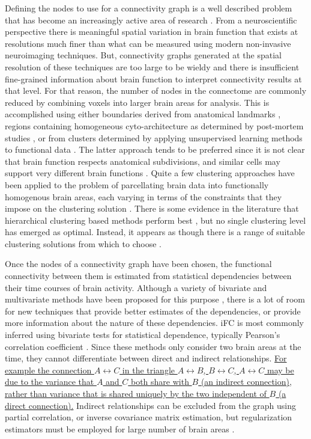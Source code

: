 \documentclass{bmcart}
\newcommand{\ADDED}[1]{\textcolor{markercolor}{\uline{#1}}}
\begin{document}
Defining the nodes to use for a connectivity graph is a well described problem that has become an increasingly active area of research \cite{Thirion2014}. From a neuroscientific perspective there is meaningful spatial variation in brain function that exists at resolutions much finer than what can be measured using modern non-invasive neuroimaging techniques. But, connectivity graphs generated at the spatial resolution of these techniques are too large to be wieldy and there is insufficient fine-grained information about brain function to interpret connectivity results at that level. For that reason, the number of nodes in the connectome are commonly reduced by combining voxels into larger brain areas for analysis. This is accomplished using either boundaries derived from anatomical landmarks \cite{Desikan2006,AAL2002}, regions containing homogeneous cyto-architecture as determined by post-mortem studies \cite{Eickhoff2008}, or from clusters determined by applying unsupervised learning methods to functional data \cite{Bellec2006,Craddock2012}. The latter approach tends to be preferred since it is not clear that brain function respects anatomical subdivisions, and similar cells may support very different brain functions \cite{Craddock2012}. Quite a few clustering approaches have been applied to the problem of parcellating brain data into functionally homogenous brain areas, each varying in terms of the constraints that they impose on the clustering solution  \cite{Craddock2012,Blumensath2013,Bellec2006,Thirion2006,Zalesky2010,Flandin2002,Thirion2014}. There is some evidence in the literature that hierarchical clustering based methods perform best \cite{Blumensath2013,Thirion2014}, but no single clustering level has emerged as optimal. Instead, it appears as though there is a range of suitable clustering solutions from which to choose  \cite{Craddock2012,Thirion2014}.  

Once the nodes of a connectivity graph have been chosen, the functional connectivity between them is estimated from statistical dependencies between their time courses of brain activity. Although a variety of bivariate and multivariate methods have been proposed for this purpose \cite{Smith2011,Varoquaux2013}, there is a lot of room for new techniques that provide better estimates of the dependencies, or provide more information about the nature of these dependencies. iFC is most commonly inferred using bivariate tests for statistical dependence, typically Pearson's correlation coefficient \cite{Biswal1995}. Since these methods only consider two brain areas at the time, they cannot differentiate between direct and indirect relationships. \ADDED{For example the connection $A \leftrightarrow C$ in the triangle $A \leftrightarrow B$, $B \leftrightarrow C$, $A \leftrightarrow C$ may be due to the variance that $A$ and $C$ both share with $B$ (an indirect connection), rather than variance that is shared uniquely by the two independent of $B$ (a direct connection).} Indirect relationships can be excluded from the graph using partial correlation, or inverse covariance matrix estimation, but regularization estimators must be employed for large number of brain areas \cite{Ryali2012,Varoquaux2013}. 
\end{document}
